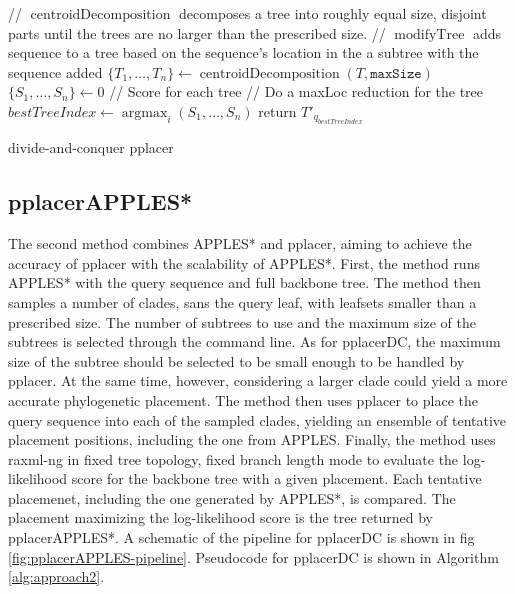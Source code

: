 \documentclass[10pt]{article}
\begin{document}
\begin{algorithm}[!htb]
\SetAlgoLined
{}
 // $\operatorname{centroidDecomposition}$ decomposes a tree into roughly equal size, disjoint parts until the trees are no larger than the prescribed size.\;
 // $\operatorname{modifyTree}$ adds sequence to a tree based on the sequence's location in the a subtree with the sequence added\;
 $\{T_1,\dots,T_n\} \leftarrow \operatorname{centroidDecomposition}(T,\texttt{maxSize})$\;
 $\{S_1, \dots, S_n\} \leftarrow 0$ // Score for each tree\;
 // Do a maxLoc reduction for the tree\;
 $bestTreeIndex \leftarrow \operatorname{argmax}_{i} (S_1,\dots,S_n)$\;
 return $T'_{q_{bestTreeIndex}}$\;
 \caption{divide-and-conquer pplacer}
 \label{alg:approach1}
\end{algorithm}

\subsection{pplacerAPPLES*}

The second method combines APPLES* and pplacer, aiming to achieve the accuracy of pplacer with the scalability of APPLES*.
First, the method runs APPLES* with the query sequence and full backbone tree.
The method then samples a number of clades, sans the query leaf, with leafsets smaller
than a prescribed size.
The number of subtrees to use and the maximum size of the subtrees is selected through the command line.
As for pplacerDC, the maximum size of the subtree should be selected to be small enough to be handled by pplacer.
At the same time, however, considering a larger clade could yield a more accurate phylogenetic placement.
The method then uses pplacer to place the query sequence into each of the sampled clades, yielding
an ensemble of tentative placement positions, including the one from APPLES.
Finally, the method uses raxml-ng in fixed tree topology, fixed branch length mode to evaluate
the log-likelihood score for the backbone tree with a given placement.
Each tentative placemenet, including the one generated by APPLES*, is compared.
The placement maximizing the log-likelihood score is the tree returned by pplacerAPPLES*.
A schematic of the pipeline for pplacerDC is shown in fig \ref{fig:pplacerAPPLES-pipeline}.
Pseudocode for pplacerDC is shown in Algorithm \ref{alg:approach2}.
\end{document}
